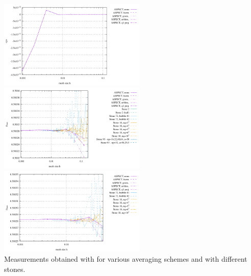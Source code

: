 \begin{center}
\includegraphics[width=7cm]{images/stokes_sphere2D/pressure_mean_FS}\\
\includegraphics[width=7cm]{images/stokes_sphere2D/pressure_max_FS}
\includegraphics[width=7cm]{images/stokes_sphere2D/pressure_max_FS_zoom}\\
{\captionfont Measurements obtained with \aspect for various averaging schemes and with different stones.}
\end{center}

